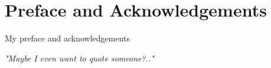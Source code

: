 \chapter*{Preface and Acknowledgements}
\label{chap:preface}

My preface and acknowledgements

\newpage
\textit{"Maybe I even want to quote someone?.."} \\
\newline
{} \\
\vspace{1cm}
